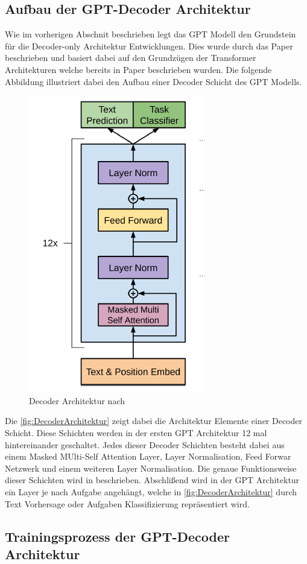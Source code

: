 \documentclass[conference]{IEEEtran}
\begin{document}
\subsection{Aufbau der GPT-Decoder Architektur}
Wie im vorherigen Abschnit beschrieben legt das GPT Modell den Grundstein für die Decoder-only Architektur Entwicklungen. Dies wurde durch das Paper \cite{radfordImprovingLanguageUnderstanding} beschrieben und basiert dabei auf den Grundzügen der Transformer Architekturen welche bereits in Paper \cite{vaswaniAttentionAllYou2023} beschrieben wurden. Die 
folgende Abbildung illustriert dabei den Aufbau einer Decoder Schicht des GPT Modells.
\begin{figure}[htbp]
    \centerline{\includegraphics[width=0.4\linewidth]{Bilder/DecoderArchitekturGPT.png}}
    \caption{Decoder Architektur nach \cite{radfordImprovingLanguageUnderstanding}}
    \label{fig:DecoderArchitektur}
\end{figure}
Die \autoref{fig:DecoderArchitektur} zeigt dabei die Architektur Elemente einer Decoder Schicht. Diese Schichten werden in der ersten GPT Architektur 12 mal hintereinander geschaltet. Jedes dieser Decoder Schichten besteht dabei aus einem Masked MUlti-Self Attention Layer, Layer Normalisation, Feed Forwar Netzwerk und einem weiteren Layer Normalisation. Die genaue Funktionsweise dieser Schichten wird in \cite{vaswaniAttentionAllYou2023} beschrieben. Abschlißend wird in der GPT Architektur ein Layer je nach Aufgabe angehängt, welche in \autoref{fig:DecoderArchitektur} durch Text Vorhersage oder Aufgaben Klassifizierung repräsentiert wird.

\subsection{Trainingsprozess der GPT-Decoder Architektur}
\end{document}
